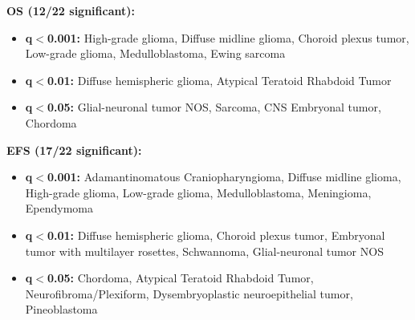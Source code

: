 \begin{table}[H]
\centering
\caption{Cancer groups with significant age decile survival differences
(multi-group log-rank test per group; BH-FDR q-value adjusted across cancer
groups within each phase; three significance tiers).\label{tab:age_decile_sig}}

\noindent\textbf{OS (12/22 significant):}
\begin{itemize}\setlength{\itemsep}{0pt}
  \item \textbf{q$ < $0.001:} High-grade glioma, Diffuse midline glioma, Choroid plexus tumor, Low-grade glioma, Medulloblastoma, Ewing sarcoma
  \item \textbf{q$ < $0.01:} Diffuse hemispheric glioma, Atypical Teratoid Rhabdoid Tumor
  \item \textbf{q$ < $0.05:} Glial-neuronal tumor NOS, Sarcoma, CNS Embryonal tumor, Chordoma
\end{itemize}

\noindent\textbf{EFS (17/22 significant):}
\begin{itemize}\setlength{\itemsep}{0pt}
  \item \textbf{q$ < $0.001:} Adamantinomatous Craniopharyngioma, Diffuse midline glioma, High-grade glioma, Low-grade glioma, Medulloblastoma, Meningioma, Ependymoma
  \item \textbf{q$ < $0.01:} Diffuse hemispheric glioma, Choroid plexus tumor, Embryonal tumor with multilayer rosettes, Schwannoma, Glial-neuronal tumor NOS
  \item \textbf{q$ < $0.05:} Chordoma, Atypical Teratoid Rhabdoid Tumor, Neurofibroma/Plexiform, Dysembryoplastic neuroepithelial tumor, Pineoblastoma
\end{itemize}
\end{table}
